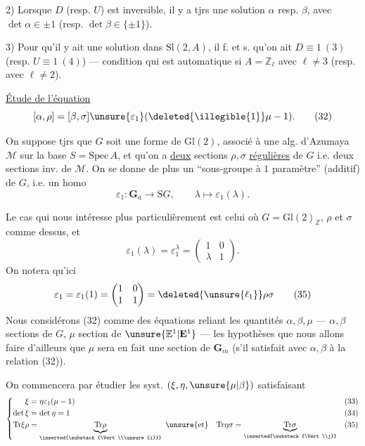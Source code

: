 2) Lorsque $D$ (resp. $U$) est inversible, il y a tjrs une solution $\alpha$ resp. $\beta$, avec $\det\alpha\in\pm1$ (resp. $\det\beta\in\{\pm1\}$).

3) Pour qu'il y ait une solution dans $\mathrm{Sl}(2,A)$, il f. et s. qu'on ait $D\equiv1\ (3)$ (resp. $U\equiv1\ (4)$) --- condition qui est automatique si $A=\mathbb{Z}_\ell$ avec $\ell\ne3$ (resp. avec $\ell\ne2$).

 \uline{Étude  de l'équation}
\[
[\alpha,\rho]=[\beta,\sigma]\unsure{\varepsilon_1}(\deleted{\illegible{1}}\mu-1). \tag{32}
\]

On suppose tjrs que $G$ soit une forme de $\mathrm{Gl}(2)$, associé à une alg. d'Azumaya $\mathcal M$ sur la base $S=\mathrm{Spec}\,A$, et qu'on a \uline{deux} sections $\rho,\sigma$ \uline{régulières} de $G$ i.e. deux sections inv. de $\mathcal M$. On se donne de plus un ``sous-groupe à $1$ paramètre'' (additif) de $G$, i.e. un homo
\[
\varepsilon_1:\mathbf G_a\longrightarrow \mathrm{S}G,\qquad \lambda\longmapsto\varepsilon_1(\lambda). \tag{33}
\]


Le cas qui nous intéresse plus particulièrement est celui où $G=\mathrm{Gl}(2)_{\mathbb{Z}}$, $\rho$ et $\sigma$ comme dessus, et
\[
\varepsilon_1(\lambda)=\varepsilon_1^\lambda=\begin{pmatrix}1&0\\\lambda&1\end{pmatrix}. \tag{34}
\]
On notera qu'ici
\[
\varepsilon_1=\varepsilon_1(1)=\begin{pmatrix}1&0\\1&1\end{pmatrix}=\deleted{\unsure{\ell_1}}\rho\sigma \tag{35}
\]
Nous considérons (32) comme des équations reliant les quantités $\alpha,\beta,\mu$ --- $\alpha,\beta$ sections  de $G$, $\mu$ section de $\unsure{\mathbb E^1|\mathbf E^1}$ --- les hypothèses que nous allons faire  d'ailleurs que $\mu$ sera en fait une section de $\mathbf G_m$ (s'il satisfait avec $\alpha,\beta$ à la relation (32)). 

On commencera par étudier les syst.  $(\xi,\eta,\unsure{\mu|\beta})$ satisfaisant
\[
\left\{\begin{aligned}
\xi&=\eta\varepsilon_1(\mu-1) && (33)\\
\det\xi&=\det\eta=1 && (34)\\
\mathrm{Tr}\xi\rho&=\underbrace{\mathrm{Tr}\rho}_{\inserted{\substack{\Vert\\\unsure{i}}}}\ \unsure{\text{et}}\quad
\mathrm{Tr}\eta\sigma=\underbrace{\mathrm{Tr}\sigma}_{\inserted{\substack{\Vert\\j}}} && (35)
\end{aligned}\right.
\]

